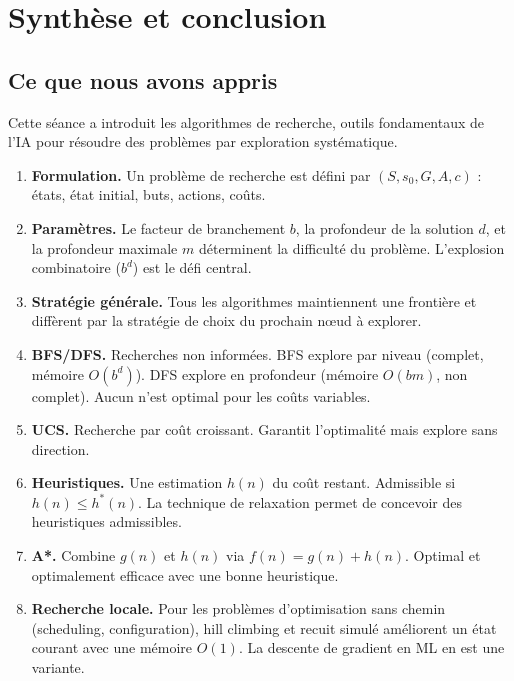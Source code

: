 \documentclass[11pt,a4paper]{article}
\begin{document}
\section{Synthèse et conclusion}

\subsection{Ce que nous avons appris}

Cette séance a introduit les algorithmes de recherche, outils fondamentaux de l'IA pour résoudre des problèmes par exploration systématique.

\begin{retenirbox}
\begin{enumerate}
    \item \textbf{Formulation.} Un problème de recherche est défini par $(S, s_0, G, A, c)$ : états, état initial, buts, actions, coûts.
    
    \item \textbf{Paramètres.} Le facteur de branchement $b$, la profondeur de la solution $d$, et la profondeur maximale $m$ déterminent la difficulté du problème. L'explosion combinatoire ($b^d$) est le défi central.
    
    \item \textbf{Stratégie générale.} Tous les algorithmes maintiennent une frontière et diffèrent par la stratégie de choix du prochain nœud à explorer.
    
    \item \textbf{BFS/DFS.} Recherches non informées. BFS explore par niveau (complet, mémoire $O(b^d)$). DFS explore en profondeur (mémoire $O(bm)$, non complet). Aucun n'est optimal pour les coûts variables.
    
    \item \textbf{UCS.} Recherche par coût croissant. Garantit l'optimalité mais explore sans direction.
    
    \item \textbf{Heuristiques.} Une estimation $h(n)$ du coût restant. Admissible si $h(n) \leq h^*(n)$. La technique de relaxation permet de concevoir des heuristiques admissibles.
    
    \item \textbf{A*.} Combine $g(n)$ et $h(n)$ via $f(n) = g(n) + h(n)$. Optimal et optimalement efficace avec une bonne heuristique.
    
    \item \textbf{Recherche locale.} Pour les problèmes d'optimisation sans chemin (scheduling, configuration), hill climbing et recuit simulé améliorent un état courant avec une mémoire $O(1)$. La descente de gradient en ML en est une variante.
\end{enumerate}
\end{retenirbox}
\end{document}
